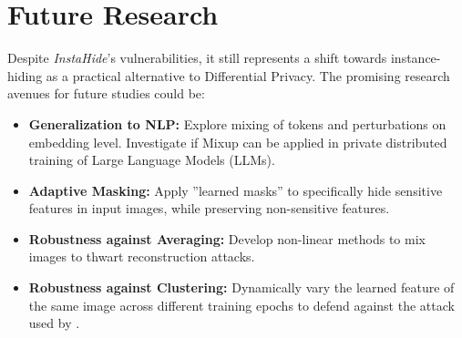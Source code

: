 \documentclass[12pt,a4paper]{article}
\begin{document}
\section{Future Research}

Despite \textit{InstaHide}'s vulnerabilities, it still represents a shift towards instance-hiding as a practical alternative to Differential Privacy. The promising research avenues for future studies could be:

\begin{itemize}
    \item \textbf{Generalization to NLP:} Explore mixing of tokens and perturbations on embedding level. Investigate if Mixup can be applied in private distributed training of Large Language Models (LLMs).
    \item \textbf{Adaptive Masking:} Apply ''learned masks'' to specifically hide sensitive features in input images, while preserving non-sensitive features.
    \item \textbf{Robustness against Averaging:} Develop non-linear methods to mix images to thwart reconstruction attacks.
    \item \textbf{Robustness against Clustering:} Dynamically vary the learned feature of the same image across different training epochs to defend against the attack used by \citeauthor{carlini2021privatelearningpossibleinstance}.
\end{itemize}
\end{document}
